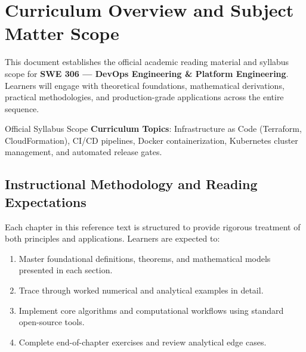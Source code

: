 \section{Curriculum Overview and Subject Matter Scope}

This document establishes the official academic reading material and syllabus scope for \textbf{SWE 306 --- DevOps Engineering \& Platform Engineering}. Learners will engage with theoretical foundations, mathematical derivations, practical methodologies, and production-grade applications across the entire sequence.

\begin{InsightBox}{Official Syllabus Scope}
  \textbf{Curriculum Topics}: Infrastructure as Code (Terraform, CloudFormation), CI/CD pipelines, Docker containerization, Kubernetes cluster management, and automated release gates.
\end{InsightBox}

\subsection{Instructional Methodology and Reading Expectations}

Each chapter in this reference text is structured to provide rigorous treatment of both principles and applications. Learners are expected to:
\begin{enumerate}
  \item Master foundational definitions, theorems, and mathematical models presented in each section.
  \item Trace through worked numerical and analytical examples in detail.
  \item Implement core algorithms and computational workflows using standard open-source tools.
  \item Complete end-of-chapter exercises and review analytical edge cases.
\end{enumerate}

